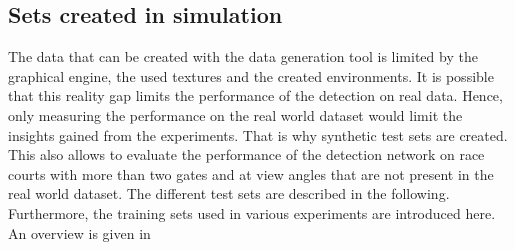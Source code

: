 \subsection{Sets created in simulation}
\label{sec:synthetic_sets}
The data that can be created with the data generation tool is limited by the graphical engine, the used textures and the created environments. It is possible that this reality gap limits the performance of the detection on real data. Hence, only measuring the performance on the real world dataset would limit the insights gained from the experiments. That is why synthetic test sets are created. This also allows to evaluate the performance of the detection network on race courts with more than two gates and at view angles that are not present in the real world dataset.  
The different test sets are described in the following. Furthermore, the training sets used in various experiments are introduced here. An overview is given in 


